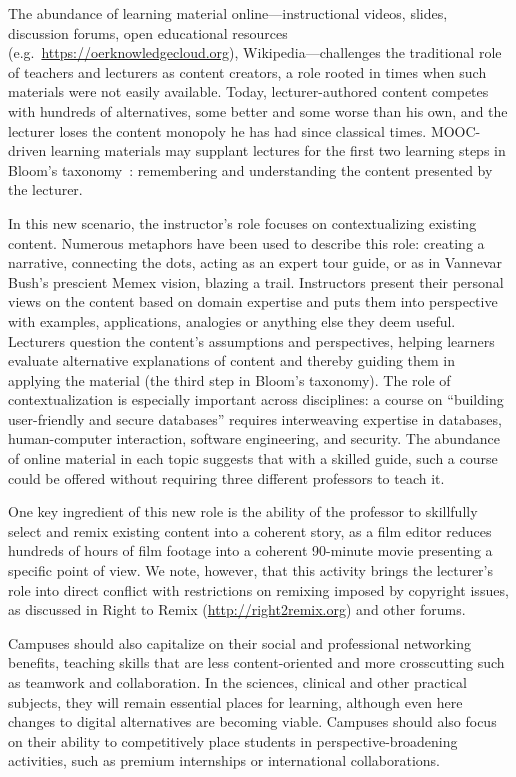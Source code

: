 The abundance of learning material online---instructional videos,
slides, discussion forums, open educational resources (e.g.\ \url{https://oerknowledgecloud.org}),
Wikipedia---challenges the traditional role of teachers and lecturers as
content creators, a role rooted in times when such materials were not
easily available.
Today, lecturer-authored content competes with hundreds of alternatives,
some better and some worse than his own, and the lecturer
loses the content monopoly he has had since classical times.
MOOC-driven learning materials may supplant lectures for the first two
learning steps in Bloom's taxonomy~\cite{blooms-taxonomy-revised}:
remembering and understanding the content 
presented by the lecturer.

In this new scenario, the instructor's role focuses on contextualizing
existing content.
Numerous metaphors have been used to describe this role: creating a
narrative, connecting the dots, acting as an expert tour guide, or as in
Vannevar Bush's prescient Memex vision, blazing a trail.
Instructors present their personal views on the content based on
domain expertise and puts them into perspective with examples, applications,
analogies or anything else they deem useful. Lecturers question
the content's assumptions and perspectives, helping learners evaluate
alternative explanations of content and thereby guiding them in applying
the material (the third step in Bloom's taxonomy).
The role of contextualization is especially important across
disciplines: a course on 
``building user-friendly and secure databases'' requires interweaving
expertise in databases, human-computer interaction, software
engineering, and security.
The abundance of online material in each topic suggests that with a
skilled guide, such a course could be offered without requiring three different
professors to teach it.
 
One key ingredient of this new role is the ability of the professor to 
skillfully select and remix existing content into a coherent story,
as a film editor reduces hundreds of hours of film footage into a
coherent 90-minute movie presenting a specific point of view.
We note, however, that this activity brings the lecturer's role into direct
conflict with restrictions on remixing imposed by copyright issues, as
discussed in Right to Remix (\url{http://right2remix.org}) and other forums.

Campuses should also capitalize on their social and professional
networking benefits, teaching skills that are less content-oriented and
more crosscutting such as teamwork and collaboration.
In the sciences, clinical and other practical subjects, they will remain essential places for learning, although even here changes to digital alternatives are becoming viable.
Campuses should also focus on their ability to competitively place
students in perspective-broadening
activities, such as premium internships or international collaborations.

